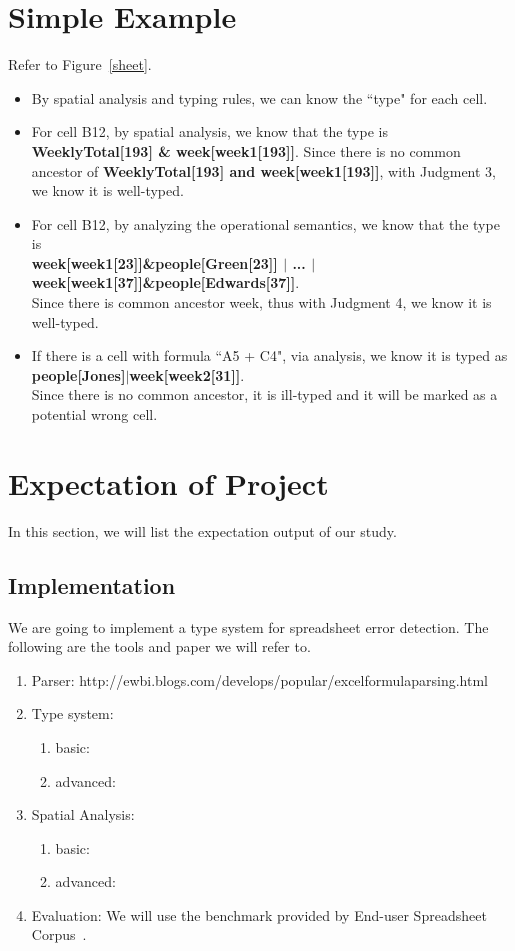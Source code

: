 \documentclass[a4paper]{article}
\begin{document}
\section{Simple Example}
Refer to Figure~\ref{sheet}.
\begin{itemize}
\item By spatial analysis and typing rules, we can know the ``type" for each cell. 
\item For cell B12, by spatial analysis, we know that the type is \textbf{WeeklyTotal[193] \& week[week1[193]]}. Since there is no common ancestor of \textbf{WeeklyTotal[193] and week[week1[193]]}, with Judgment 3, we know it is well-typed.
\item For cell B12, by analyzing the operational semantics, we know that the type is \\
\textbf{week[week1[23]]\&people[Green[23]] $|$ ... $|$ week[week1[37]]\&people[Edwards[37]]}. \\
Since there is common ancestor week, thus with Judgment 4, we know it is well-typed.
\item If there is a cell with formula ``A5 + C4", via analysis, we know it is typed as \textbf{people[Jones]$|$week[week2[31]]}.\\ 
Since there is no common ancestor, it is ill-typed and it will be marked as a potential wrong cell.
\end{itemize}

\section{Expectation of Project}
In this section, we will list the expectation output of our study.
\subsection{Implementation}
We are going to implement a type system for spreadsheet error detection. The following are the tools and paper we will refer to.
\begin{enumerate}
\item Parser: http://ewbi.blogs.com/develops/popular/excelformulaparsing.html
\item Type system:
  \begin{enumerate}
	\item basic: \cite{abraham2006type}
    \item advanced: \cite{cunha2015embedding}
  \end{enumerate}
\item Spatial Analysis:
  \begin{enumerate}
	\item basic: \cite{abraham2004header}
    \item advanced: \cite{chambers2009automatic}
  \end{enumerate}
\item Evaluation: We will use the benchmark provided by End-user Spreadsheet Corpus~\cite{fisher2005euses}.
\end{enumerate}
\end{document}
